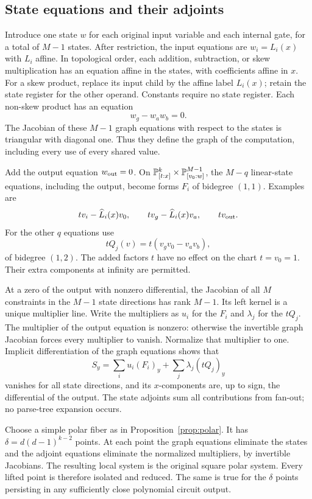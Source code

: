 \subsection*{State equations and their adjoints}

Introduce one state $w$ for each original input variable and each
internal gate, for a total of $M-1$ states. After restriction, the input
equations are $w_i=L_i(x)$ with $L_i$ affine. In topological order, each
addition, subtraction, or skew multiplication has an equation affine
in the states, with coefficients affine in $x$. For a skew product,
replace its input child by the affine label $L_i(x)$; retain the state
register for the other operand. Constants require no state register.
Each non-skew product has an equation
\[
 w_g-w_aw_b=0.
\]
The Jacobian of these $M-1$ graph equations with respect to the states
is triangular with diagonal one. Thus they define the graph of the
computation, including every use of every shared value.

Add the output equation $w_{\rm out}=0$. On
$\mathbb P^k_{[t:x]}\times\mathbb P^{M-1}_{[v_0:w]}$, the $M-q$ linear-state
equations, including the output, become forms $F_i$ of bidegree
$(1,1)$. Examples are
\[
 tv_i-\widehat L_i(x)v_0,\qquad
 tv_g-\widehat L_i(x)v_a,\qquad tv_{\rm out}.
\]
For the other $q$ equations use
\[
 tQ_j(v)=t(v_gv_0-v_av_b),
\]
of bidegree $(1,2)$. The added factors $t$ have no effect on the
chart $t=v_0=1$. Their extra components at infinity are permitted.

At a zero of the output with nonzero differential, the Jacobian of
all $M$ constraints in the $M-1$ state directions has rank $M-1$.
Its left kernel is a unique multiplier line. Write the multipliers as
$u_i$ for the $F_i$ and $\lambda_j$ for the $tQ_j$. The multiplier of
the output equation is nonzero: otherwise the invertible graph
Jacobian forces every multiplier to vanish. Normalize that multiplier
to one. Implicit differentiation of the graph equations shows that
\[
 S_y=\sum_i u_i(F_i)_y+\sum_j\lambda_j(tQ_j)_y
\]
vanishes for all state directions, and its $x$-components are, up to
sign, the differential of the output. The state adjoints sum all
contributions from fan-out; no parse-tree expansion occurs.

Choose a simple polar fiber as in Proposition~\ref{prop:polar}. It
has $\delta=d(d-1)^{k-2}$ points. At each point the graph equations
eliminate the states and the adjoint equations eliminate the normalized
multipliers, by invertible Jacobians. The resulting local system is
the original square polar system. Every lifted point is therefore
isolated and reduced. The same is true for the $\delta$ points
persisting in any sufficiently close polynomial circuit output.

